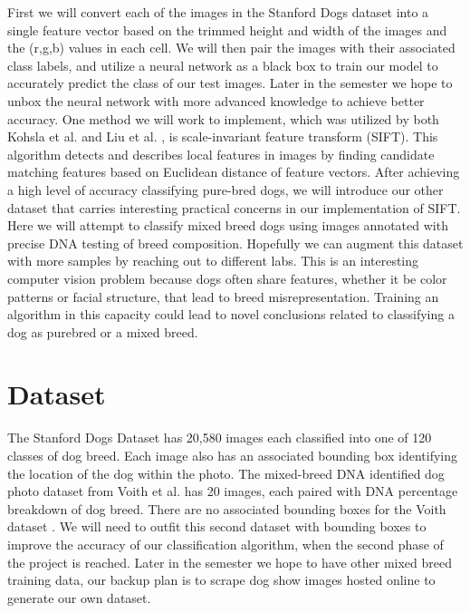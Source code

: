 \documentclass{article}
\begin{document}
First we will convert each of the images in the Stanford Dogs dataset \cite{khosla2011novel} into a single feature vector based on the trimmed height and width of the images and the (r,g,b) values in each cell. We will then pair the images with their associated class labels, and utilize a neural network as a black box to train our model to accurately predict the class of our test images. Later in the semester we hope to unbox the neural network with more advanced knowledge to achieve better accuracy. One method we will work to implement, which was utilized by both Kohsla et al. \cite{khosla2011novel} and Liu et al. \cite{liu2012dog}, is scale-invariant feature transform (SIFT). This algorithm detects and describes local features in images by finding candidate matching features based on Euclidean distance of feature vectors.  \cite{lowe2004distinctive} After achieving a high level of accuracy classifying pure-bred dogs, we will introduce our other dataset \cite{voith2009comparison} that carries interesting practical concerns in our implementation of SIFT. Here we will attempt to classify mixed breed dogs using images annotated with precise DNA testing of breed composition. Hopefully we can augment this dataset with more samples by reaching out to different labs. This is an interesting computer vision problem because dogs often share features, whether it be color patterns or facial structure, that lead to breed misrepresentation.  Training an algorithm in this capacity could lead to novel conclusions related to classifying a dog as purebred or a mixed breed. 
 
\section{Dataset}

The Stanford Dogs Dataset has 20,580 images each classified into one of 120 classes of dog breed. \cite{khosla2011novel} Each image also has an associated bounding box identifying the location of the dog within the photo. The mixed-breed DNA identified dog photo dataset from Voith et al. \cite{voith2009comparison} has 20 images, each paired with DNA percentage breakdown of dog breed. There are no associated bounding boxes for the Voith dataset \cite{voith2009comparison}. We will need to outfit this second dataset with bounding boxes to improve the accuracy of our classification algorithm, when the second phase of the project is reached. Later in the semester we hope to have other mixed breed training data, our backup plan is to scrape dog show images hosted online to generate our own dataset. 
 
\end{document}
